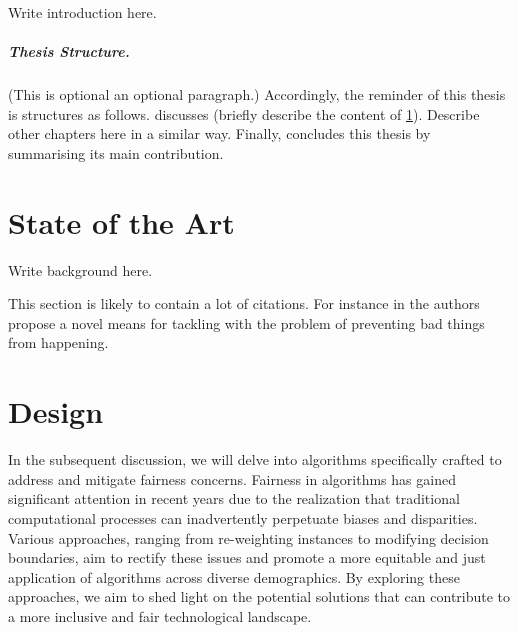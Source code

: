 \documentclass[12pt,a4paper,openright,twoside]{book}
\begin{document}
Write introduction here.

%
\paragraph{Thesis Structure.} %
%

(This is optional an optional paragraph.)
%
Accordingly, the reminder of this thesis is structures as follows.
%
 discusses (briefly describe the content of \cref{chap:background}).
%
Describe other chapters here in a similar way.
%
Finally,  concludes this thesis by summarising its main contribution.

\chapter{State of the Art} %
\label{chap:background}

Write background here.

This section is likely to contain a lot of citations.
%
For instance in \cite{AnzengruberSocInfo2013} the authors propose a novel means for tackling with the problem of preventing bad things from happening.

\chapter{Design} %
\label{chap:design}
In the subsequent discussion, we will delve into algorithms specifically crafted to address and mitigate fairness concerns. Fairness in algorithms has gained significant attention in recent years due to the realization that traditional computational processes can inadvertently perpetuate biases and disparities. Various approaches, ranging from re-weighting instances to modifying decision boundaries, aim to rectify these issues and promote a more equitable and just application of algorithms across diverse demographics. By exploring these approaches, we aim to shed light on the potential solutions that can contribute to a more inclusive and fair technological landscape.
\end{document}
